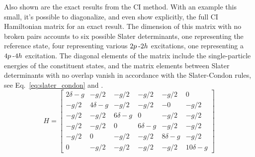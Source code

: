 \documentclass[thesis.tex]{subfiles}
\begin{document}
Also shown are the exact results from the CI method.  With an example this small, it's possible to diagonalize, and even show explicitly, the full CI Hamiltonian matrix for an exact result.  The dimension of this matrix with no broken pairs accounts to six possible Slater determinants, one representing the reference state, four representing various $2p\hspace{2pt}\text{-}2h$ excitations, one representing a $4p\hspace{2pt}\text{-}4h$ excitation.  The diagonal elements of the matrix include the single-particle energies of the constituent states, and the matrix elements between Slater determinants with no overlap vanish in accordance with the Slater-Condon rules, see Eq.\ \eqref{eq:slater_condon} and \cite{SLATER1929,CONDON1930}.
\begin{equation}
  H = \begin{bmatrix}
    2\delta -g & -g/2 & -g/2 & -g/2 & -g/2 & 0 \\ -g/2 & 4\delta -g &
    -g/2 & -g/2 & -0 & -g/2 \\ -g/2 & -g/2 & 6\delta -g & 0 & -g/2 &
    -g/2 \\ -g/2 & -g/2 & 0 & 6\delta-g & -g/2 & -g/2 \\ -g/2 & 0 & -g/2
    & -g/2 & 8\delta-g & -g/2 \\ 0 & -g/2 & -g/2 & -g/2 & -g/2 &
    10\delta -g
  \end{bmatrix}
\end{equation}
\end{document}
